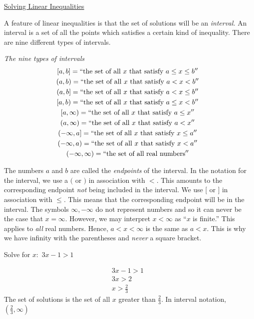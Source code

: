\underline{Solving Linear Inequalities}

A feature of linear inequalities is that the set of solutions will be an \emph{interval.} An interval is a set of all the points which satisfies a certain kind of inequality. There are nine different types of intervals.

\emph{The nine types of intervals}
\begin{gather*}
    \left[a,b\right] = ``\textrm{the set of all} \ x \ \textrm{that satisfy} \ a\le x \le b'' \\
    \left(a,b\right) = ``\textrm{the set of all} \ x \ \textrm{that satisfy} \ a< x < b'' \\
    \left(a,b\right] = ``\textrm{the set of all} \ x \ \textrm{that satisfy} \ a < x \le b'' \\
    \left[a,b\right) = ``\textrm{the set of all} \ x \ \textrm{that satisfy} \ a\le x < b'' \\
    \left[a,\infty\right) = ``\textrm{the set of all} \ x \ \textrm{that satisfy} \ a\le x'' \\
    \left(a,\infty\right) = ``\textrm{the set of all} \ x \ \textrm{that satisfy} \ a < x'' \\
    \left(-\infty,a\right] = ``\textrm{the set of all} \ x \ \textrm{that satisfy} \ x \le a'' \\
    \left(-\infty,a\right) =``\textrm{the set of all} \ x \ \textrm{that satisfy} \ x < a'' \\
    \left(-\infty,\infty\right) = ``\textrm{the set of all real numbers}''
\end{gather*}

The numbers \(a\) and \(b\) are called the \emph{endpoints} of the interval. In the notation for the interval, we use a \((\) or \()\) in association with \(<\). This amounts to the corresponding endpoint \emph{not} being included in the interval. We use \([\) or \(]\) in association with \(\le.\) This means that the corresponding endpoint will be in the interval. The symbols \(\infty, -\infty\) do not represent numbers and so it can never be the case that \(x=\infty.\) However, we may interpret \(x < \infty\) as ``\(x\) is finite.'' This applies to \emph{all} real numbers. Hence, \(a <x <\infty\) is the same as \(a<x.\) This is why we have infinity with the parentheses and \emph{never} a square bracket.

\begin{question}
    Solve for \(x:\) \(3x-1>1\)

    \begin{solution}
        \begin{gather*}
            3x-1>1\\
            3x>2 \\
            x>\frac{2}{3}
        \end{gather*}
        The set of solutions is the set of all \(x\) greater than \(\frac{2}{3}.\)
        In interval notation, \(\left(\frac{2}{3},\infty\right)\)
    \end{solution}
\end{question}

